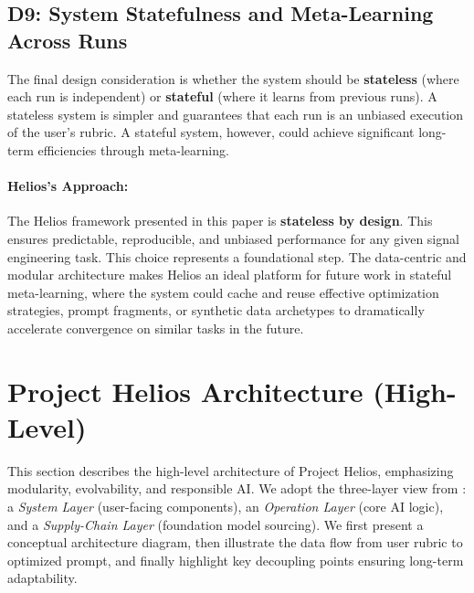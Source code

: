 \documentclass{article}
\begin{document}
\subsection*{D9: System Statefulness and Meta-Learning Across Runs}
The final design consideration is whether the system should be \textbf{stateless} (where each run is independent) or \textbf{stateful} (where it learns from previous runs). A stateless system is simpler and guarantees that each run is an unbiased execution of the user's rubric. A stateful system, however, could achieve significant long-term efficiencies through meta-learning.

\paragraph{Helios's Approach:} The Helios framework presented in this paper is \textbf{stateless by design}. This ensures predictable, reproducible, and unbiased performance for any given signal engineering task. This choice represents a foundational step. The data-centric and modular architecture makes Helios an ideal platform for future work in stateful meta-learning, where the system could cache and reuse effective optimization strategies, prompt fragments, or synthetic data archetypes to dramatically accelerate convergence on similar tasks in the future.

\section{Project Helios Architecture (High-Level)}
\label{sec:architecture}
This section describes the high-level architecture of Project Helios, emphasizing modularity, evolvability, and responsible AI. We adopt the three-layer view from \citep{lu2024referencearchitecturedesigningfoundation}: a \textit{System Layer} (user-facing components), an \textit{Operation Layer} (core AI logic), and a \textit{Supply-Chain Layer} (foundation model sourcing). We first present a conceptual architecture diagram, then illustrate the data flow from user rubric to optimized prompt, and finally highlight key decoupling points ensuring long-term adaptability.
\end{document}
